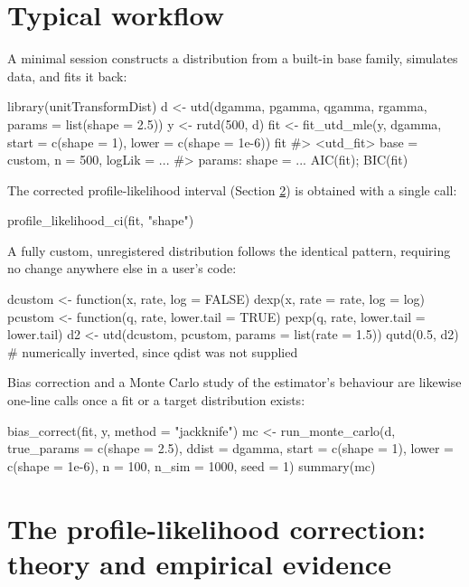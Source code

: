 \section{Typical workflow}
\label{sec:workflow}

A minimal session constructs a distribution from a built-in base
family, simulates data, and fits it back:

\begin{example}
library(unitTransformDist)
d <- utd(dgamma, pgamma, qgamma, rgamma, params = list(shape = 2.5))
y <- rutd(500, d)
fit <- fit_utd_mle(y, dgamma, start = c(shape = 1), lower = c(shape = 1e-6))
fit
#> <utd_fit> base = custom, n = 500, logLik = ...
#> params: shape = ...
AIC(fit); BIC(fit)
\end{example}

The corrected profile-likelihood interval (Section
\ref{sec:contribution}) is obtained with a single call:

\begin{example}
profile_likelihood_ci(fit, "shape")
\end{example}

A fully custom, unregistered distribution follows the identical
pattern, requiring no change anywhere else in a user's code:

\begin{example}
dcustom <- function(x, rate, log = FALSE) dexp(x, rate = rate, log = log)
pcustom <- function(q, rate, lower.tail = TRUE) pexp(q, rate, lower.tail = lower.tail)
d2 <- utd(dcustom, pcustom, params = list(rate = 1.5))
qutd(0.5, d2)  # numerically inverted, since qdist was not supplied
\end{example}

Bias correction and a Monte Carlo study of the estimator's behaviour
are likewise one-line calls once a fit or a target distribution exists:

\begin{example}
bias_correct(fit, y, method = "jackknife")
mc <- run_monte_carlo(d, true_params = c(shape = 2.5), ddist = dgamma,
                       start = c(shape = 1), lower = c(shape = 1e-6),
                       n = 100, n_sim = 1000, seed = 1)
summary(mc)
\end{example}

\section{The profile-likelihood correction: theory and empirical evidence}
\label{sec:contribution}

